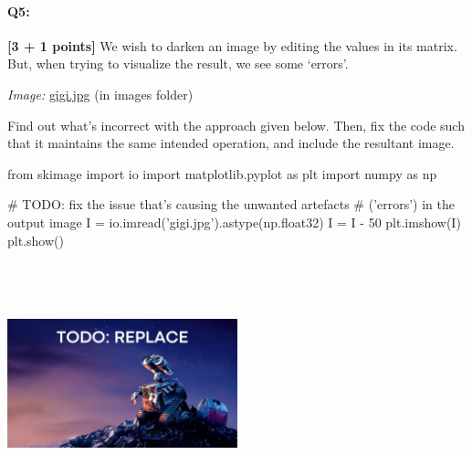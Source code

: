 \documentclass[11pt]{article}
\begin{document}

\pagebreak
    \paragraph{Q5:} \textbf{[3 + 1 points]} We wish to darken an image by editing the values in its matrix. But, when trying to visualize the result, we see some `errors'.

\emph{Image:} \href{images/gigi.jpg}{gigi.jpg} (in images folder)

\begin{tcolorbox}[colback=orange!5!white,colframe=orange!75!black]
Find out what's incorrect with the approach given below. Then, fix the code such that it maintains the same intended operation, and include the resultant image.
\end{tcolorbox}

\begin{tcolorbox}[colback=white!5!white,colframe=green!75!black,height fill]
    \begin{python}
    from skimage import io
    import matplotlib.pyplot as plt
    import numpy as np
    
    # TODO: fix the issue that's causing the unwanted artefacts
    # ('errors') in the output image
    I = io.imread('gigi.jpg').astype(np.float32)
    I = I - 50
    plt.imshow(I)
    plt.show()
    \end{python}
    
    \includegraphics[width=0.5\textwidth,height=7cm,keepaspectratio]{images/TODO wall-e.jpg}

\end{tcolorbox}





\end{document}
